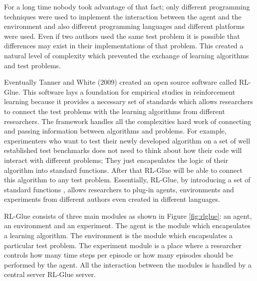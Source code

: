For a long time nobody took advantage of that fact; only different programming techniques were used to implement the interaction between the agent and the environment and also different programming languages and different platforms were used. Even if two authors used the same test problem it is possible that differences may exist in their implementations of that problem. This created a natural level of complexity which prevented the exchange of learning algorithms and test problems.

Eventually Tanner and White (2009)\nocite{tanner2009rl} created an open source software called RL-Glue. This software lays a foundation for empirical studies in reinforcement learning because it provides a necessary set of standards which allows researchers to connect the test problems with the learning algorithms from different researchers. The framework handles all the complexities hard work of connecting and passing information between algorithms and problems. For example, experimenters who want to test their newly developed algorithm on a set of well established test benchmarks does not need to think about how their code will interact with different problems; They just encapsulates the logic of their algorithm into standard functions. After that RL-Glue will be able to connect this algorithm to any test problem. Essentially, RL-Glue, by introducing a set of standard functions , allows researchers to plug-in agents, environments and experiments from different authors even created in different languages.

RL-Glue consists of three main modules as shown in Figure \ref{fig:rlglue}: an agent, an environment and an experiment. The agent is the module which encapsulates a learning algorithm. The environment is the module which encapsulates a particular test problem. The experiment module is a place where a researcher controls how many time steps per episode or how many episodes should be performed by the agent. All the interaction between the modules is handled by a central server RL-Glue server.

